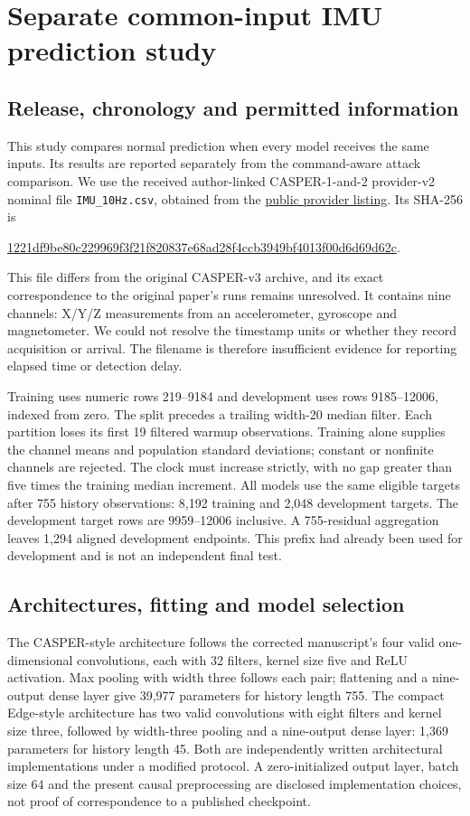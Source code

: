 \section{Separate common-input IMU prediction study}\label{app:imu}
\subsection{Release, chronology and permitted information}
This study compares normal prediction when every model receives the same inputs. Its results are reported separately from the command-aware attack comparison. We use the received author-linked CASPER-1-and-2 provider-v2 nominal file \texttt{IMU\_10Hz.csv}, obtained from the \href{https://www.kaggle.com/datasets/hkayan/industrial-robotic-arm-imu-data-casper-1-and-2}{public provider listing}. Its SHA-256 is\nopagebreak[4]
\begin{center}\small\url{1221df9be80c229969f3f21f820837e68ad28f4ccb3949bf4013f00d6d69d62c}.\end{center}
This file differs from the original CASPER-v3 archive, and its exact correspondence to the original paper's runs remains unresolved. It contains nine channels: X/Y/Z measurements from an accelerometer, gyroscope and magnetometer. We could not resolve the timestamp units or whether they record acquisition or arrival. The filename is therefore insufficient evidence for reporting elapsed time or detection delay.

Training uses numeric rows 219--9184 and development uses rows 9185--12006, indexed from zero. The split precedes a trailing width-20 median filter. Each partition loses its first 19 filtered warmup observations. Training alone supplies the channel means and population standard deviations; constant or nonfinite channels are rejected. The clock must increase strictly, with no gap greater than five times the training median increment. All models use the same eligible targets after 755 history observations: 8,192 training and 2,048 development targets. The development target rows are 9959--12006 inclusive. A 755-residual aggregation leaves 1,294 aligned development endpoints. This prefix had already been used for development and is not an independent final test.

\subsection{Architectures, fitting and model selection}
The CASPER-style architecture follows the corrected manuscript's four valid one-dimensional convolutions, each with 32 filters, kernel size five and ReLU activation. Max pooling with width three follows each pair; flattening and a nine-output dense layer give 39,977 parameters for history length 755. The compact Edge-style architecture has two valid convolutions with eight filters and kernel size three, followed by width-three pooling and a nine-output dense layer: 1,369 parameters for history length 45. Both are independently written architectural implementations under a modified protocol. A zero-initialized output layer, batch size 64 and the present causal preprocessing are disclosed implementation choices, not proof of correspondence to a published checkpoint.

